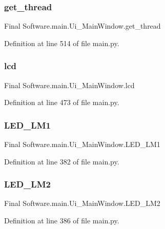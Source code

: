 \subsubsection{get\_thread}
{\footnotesize\ttfamily Final Software.\+main.\+Ui\+\_\+\+Main\+Window.\+get\+\_\+thread}



Definition at line 514 of file main.\+py.

\mbox{\label{class_final_01_software_1_1main_1_1_ui___main_window_a75cdbf1e4ef8eac6a0a514240d8e3bbb}} 
\subsubsection{lcd}
{\footnotesize\ttfamily Final Software.\+main.\+Ui\+\_\+\+Main\+Window.\+lcd}



Definition at line 473 of file main.\+py.

\mbox{\label{class_final_01_software_1_1main_1_1_ui___main_window_a7facb390bfdde6e50171760891999d7e}} 
\subsubsection{LED\_LM1}
{\footnotesize\ttfamily Final Software.\+main.\+Ui\+\_\+\+Main\+Window.\+L\+E\+D\+\_\+\+L\+M1}



Definition at line 382 of file main.\+py.

\mbox{\label{class_final_01_software_1_1main_1_1_ui___main_window_a4ed4ffc08beb34992b7b2ad6234ff444}} 
\subsubsection{LED\_LM2}
{\footnotesize\ttfamily Final Software.\+main.\+Ui\+\_\+\+Main\+Window.\+L\+E\+D\+\_\+\+L\+M2}



Definition at line 386 of file main.\+py.

